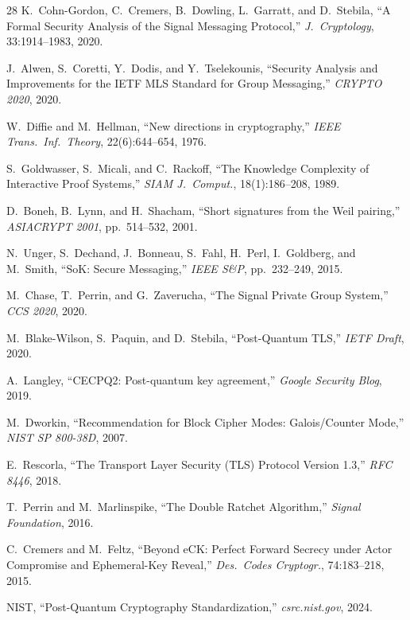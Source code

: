 \documentclass[11pt,a4paper]{article}
\begin{document}
\begin{thebibliography}{28}
K.~Cohn-Gordon, C.~Cremers, B.~Dowling, L.~Garratt, and D.~Stebila,
``A Formal Security Analysis of the Signal Messaging Protocol,''
\emph{J.\ Cryptology}, 33:1914--1983, 2020.

J.~Alwen, S.~Coretti, Y.~Dodis, and Y.~Tselekounis,
``Security Analysis and Improvements for the IETF MLS Standard for Group Messaging,''
\emph{CRYPTO 2020}, 2020.

W.~Diffie and M.~Hellman,
``New directions in cryptography,''
\emph{IEEE Trans.\ Inf.\ Theory}, 22(6):644--654, 1976.

S.~Goldwasser, S.~Micali, and C.~Rackoff,
``The Knowledge Complexity of Interactive Proof Systems,''
\emph{SIAM J.\ Comput.}, 18(1):186--208, 1989.

D.~Boneh, B.~Lynn, and H.~Shacham,
``Short signatures from the Weil pairing,''
\emph{ASIACRYPT 2001}, pp.~514--532, 2001.

N.~Unger, S.~Dechand, J.~Bonneau, S.~Fahl, H.~Perl, I.~Goldberg, and
M.~Smith,
``SoK: Secure Messaging,''
\emph{IEEE S\&P}, pp.~232--249, 2015.

M.~Chase, T.~Perrin, and G.~Zaverucha,
``The Signal Private Group System,''
\emph{CCS 2020}, 2020.

M.~Blake-Wilson, S.~Paquin, and D.~Stebila,
``Post-Quantum TLS,''
\emph{IETF Draft}, 2020.

A.~Langley,
``CECPQ2: Post-quantum key agreement,''
\emph{Google Security Blog}, 2019.

M.~Dworkin,
``Recommendation for Block Cipher Modes: Galois/Counter Mode,''
\emph{NIST SP 800-38D}, 2007.

E.~Rescorla,
``The Transport Layer Security (TLS) Protocol Version 1.3,''
\emph{RFC 8446}, 2018.

T.~Perrin and M.~Marlinspike,
``The Double Ratchet Algorithm,''
\emph{Signal Foundation}, 2016.

C.~Cremers and M.~Feltz,
``Beyond eCK: Perfect Forward Secrecy under Actor Compromise and Ephemeral-Key Reveal,''
\emph{Des.\ Codes Cryptogr.}, 74:183--218, 2015.

NIST,
``Post-Quantum Cryptography Standardization,''
\emph{csrc.nist.gov}, 2024.

\end{thebibliography}
\end{document}
